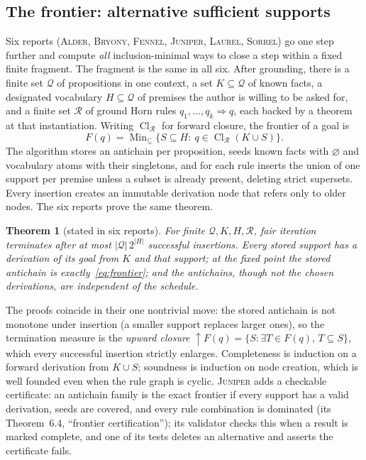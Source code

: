 \documentclass[11pt,a4paper]{article}
\newcommand{\Al}{\textsc{Alder}}
\newcommand{\Br}{\textsc{Bryony}}
\newcommand{\Fe}{\textsc{Fennel}}
\newcommand{\Ju}{\textsc{Juniper}}
\newcommand{\La}{\textsc{Laurel}}
\newcommand{\So}{\textsc{Sorrel}}
\newcommand{\Clos}{\operatorname{Cl}}
\newcommand{\Min}{\operatorname{Min}}
\theoremstyle{definition}
\theoremstyle{plain}
\newtheorem{theorem}{Theorem}[section]
\begin{document}
\subsection{The frontier: alternative sufficient supports}
Six reports (\Al, \Br, \Fe, \Ju, \La, \So) go one step further and compute \emph{all} inclusion-minimal ways to close a step within a fixed finite fragment. The fragment is the same in all six. After grounding, there is a finite set $\mathcal Q$ of propositions in one context, a set $K\subseteq\mathcal Q$ of known facts, a designated vocabulary $H\subseteq\mathcal Q$ of premises the author is willing to be asked for, and a finite set $\mathcal R$ of ground Horn rules $q_1,\ldots,q_k\Rightarrow q$, each backed by a theorem at that instantiation. Writing $\Clos_{\mathcal R}$ for forward closure, the frontier of a goal is
\begin{equation}\label{eq:frontier}
 F(q)=\Min_{\subseteq}\{S\subseteq H:\ q\in\Clos_{\mathcal R}(K\cup S)\}.
\end{equation}
The algorithm stores an antichain per proposition, seeds known facts with $\varnothing$ and vocabulary atoms with their singletons, and for each rule inserts the union of one support per premise unless a subset is already present, deleting strict supersets. Every insertion creates an immutable derivation node that refers only to older nodes. The six reports prove the same theorem.

\begin{theorem}[stated in six reports]\label{thm:antichain}
For finite $\mathcal Q,K,H,\mathcal R$, fair iteration terminates after at most $|\mathcal Q|\,2^{|H|}$ successful insertions. Every stored support has a derivation of its goal from $K$ and that support; at the fixed point the stored antichain is exactly~\eqref{eq:frontier}; and the antichains, though not the chosen derivations, are independent of the schedule.
\end{theorem}

The proofs coincide in their one nontrivial move: the stored antichain is not monotone under insertion (a smaller support replaces larger ones), so the termination measure is the \emph{upward closure} $\uparrow F(q)=\{S:\exists T\in F(q),\,T\subseteq S\}$, which every successful insertion strictly enlarges. Completeness is induction on a forward derivation from $K\cup S$; soundness is induction on node creation, which is well founded even when the rule graph is cyclic. \Ju{} adds a checkable certificate: an antichain family is the exact frontier if every support has a valid derivation, seeds are covered, and every rule combination is dominated (its Theorem~6.4, ``frontier certification''); its validator checks this when a result is marked complete, and one of its tests deletes an alternative and asserts the certificate fails.
\end{document}
